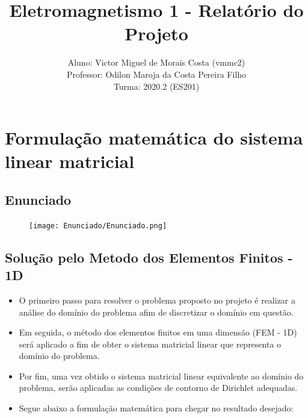 \documentclass[10pt]{article}
\title{\Huge \textbf{Eletromagnetismo 1 - Relatório do Projeto}}
\author{
Aluno: Victor Miguel de Morais Costa (vmmc2) \\
Professor: Odilon Maroja da Costa Pereira Filho \\
Turma: 2020.2 (ES201)
}
\date{}
\begin{document}
\maketitle

\newpage
{}

\section{Formulação matemática do sistema linear matricial}

    \subsection{Enunciado}
    \begin{figure}[ht]
    \centerline{\texttt{[image: Enunciado/Enunciado.png]}}
    \label{fig:dale}
    \end{figure}

    \subsection{Solução pelo Metodo dos Elementos Finitos - 1D}
    \begin{itemize}
    \item O primeiro passo para resolver o problema proposto no projeto é realizar a análise do domínio do problema afim de discretizar o domínio em questão. 
    \item Em seguida, o método dos elementos finitos em uma dimensão (FEM - 1D) será aplicado a fim de obter o sistema matricial linear que representa o domínio do problema.
    \item Por fim, uma vez obtido o sistema matricial linear equivalente ao domínio do problema, serão aplicadas as condições de contorno de Dirichlet adequadas.
    \item Segue abaixo a formulação matemática para chegar no resultado desejado:
    \end{itemize}
    
\end{document}
